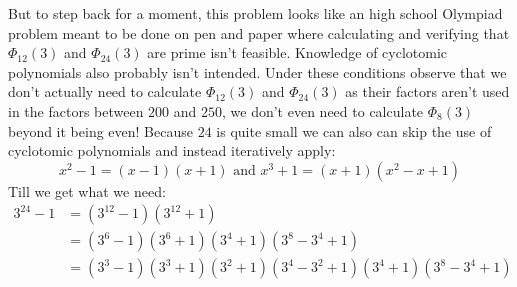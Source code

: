 But to step back for a moment,
this problem looks like an high school Olympiad problem meant to be done on pen and paper where calculating and verifying that $\Phi_{12}(3)$ and $\Phi_{24}(3)$ are prime isn't feasible.
Knowledge of cyclotomic polynomials also probably isn't intended.
Under these conditions observe that we don't actually need to calculate $\Phi_{12}(3)$ and $\Phi_{24}(3)$ as their factors aren't used in the factors between $200$ and $250$, 
we don't even need to calculate $\Phi_8(3)$ beyond it being even!
Because $24$ is quite small we can also can skip the use of cyclotomic polynomials and instead iteratively apply:
\[x^2-1=(x-1)(x+1)\text{ and }x^3+1 = (x+1)(x^2-x+1)\]
Till we get what we need:
\[\begin{aligned}
	3^{24}-1 &= (3^{12}-1)(3^{12}+1)\\
	&=(3^6-1)(3^6+1)(3^4+1)(3^8-3^4+1)\\
	&=(3^3-1)(3^3+1)(3^2+1)(3^4-3^2+1)(3^4+1)(3^8-3^4+1)\\
\end{aligned}\]

